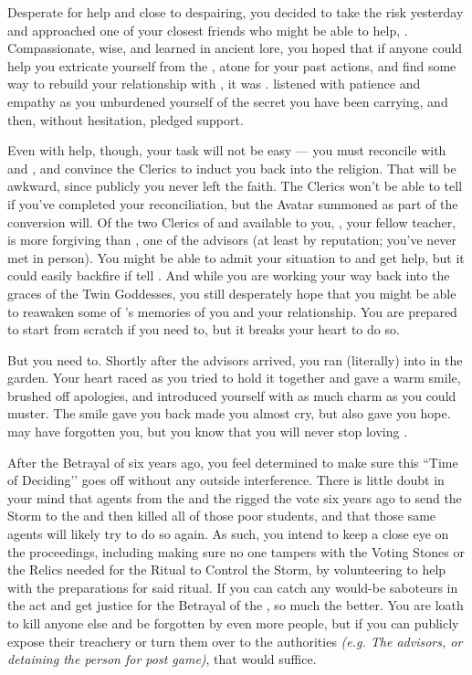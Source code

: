 \documentclass[char]{GL2020}
\begin{document}
Desperate for help and close to despairing, you decided to take the risk yesterday and approached one of your closest friends who might be able to help, \cLibrarian{\full}. Compassionate, wise, and learned in ancient lore, you hoped that if anyone could help you extricate yourself from the \pGoaties{}, atone for your past actions, and find some way to rebuild your relationship with \cHeadScientist{}, it was \cLibrarian{\them}. \cLibrarian{} listened with patience and empathy as you unburdened yourself of the secret you have been carrying, and then, without hesitation, pledged \cLibrarian{\their} support.

Even with help, though, your task will not be easy — you must reconcile with \cEbb{} and \cFlow{}, and convince the Clerics to induct you back into the religion. That will be awkward, since publicly you never left the faith. The Clerics won't be able to tell if you've completed your reconciliation, but the Avatar summoned as part of the conversion will. Of the two Clerics of \cEbb{} and \cFlow{} available to you, \cFlowPriest{\full}, your fellow teacher, is more forgiving than \cEbbPriest{\full}, one of the advisors (at least by reputation; you've never met \cEbbPriest{} in person). You might be able to admit your situation to \cFlowPriest{} and get \cFlowPriest{\their} help, but it could easily backfire if \cFlowPriest{\they} tell\cFlowPriest{\verbs} \cEbbPriest{}. And while you are working your way back into the graces of the Twin Goddesses, you still desperately hope that you might be able to reawaken some of \cHeadScientist{}’s memories of you and your relationship. You are prepared to start from scratch if you need to, but it breaks your heart to do so.

But you need to. Shortly after the advisors arrived, you ran (literally) into \cHeadScientist{} in the garden. Your heart raced as you tried to hold it together and gave \cHeadScientist{} a warm smile, brushed off \cHeadScientist{\their} apologies, and introduced yourself with as much charm as you could muster. The smile \cHeadScientist{} gave you back made you almost cry, but also gave you hope. \cHeadScientist{} may have forgotten you, but you know that you will never stop loving \cHeadScientist{\them}.

After the Betrayal of six years ago, you feel determined to make sure this ``Time of Deciding’’ goes off without any outside interference. There is little doubt in your mind that agents from the \pTech{} and the \pFarm{} rigged the vote six years ago to send the Storm to the \pShip{} and then killed all of those poor students, and that those same agents will likely try to do so again. As such, you intend to keep a close eye on the proceedings, including making sure no one tampers with the Voting Stones or the Relics needed for the Ritual to Control the Storm, by volunteering to help with the preparations for said ritual. If you can catch any would-be saboteurs in the act and get justice for the Betrayal of the \pShip{}, so much the better. You are loath to kill anyone else and be forgotten by even more people, but if you can publicly expose their treachery or turn them over to the \pShip{} authorities \emph{(e.g. The advisors, or detaining the person for post game)}, that would suffice.
\end{document}

